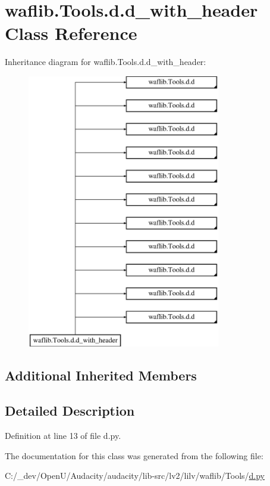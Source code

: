 \hypertarget{classwaflib_1_1_tools_1_1d_1_1d__with__header}{}\section{waflib.\+Tools.\+d.\+d\+\_\+with\+\_\+header Class Reference}
\label{classwaflib_1_1_tools_1_1d_1_1d__with__header}
Inheritance diagram for waflib.\+Tools.\+d.\+d\+\_\+with\+\_\+header\+:\begin{figure}[H]
\begin{center}
\leavevmode
\includegraphics[height=12.000000cm]{classwaflib_1_1_tools_1_1d_1_1d__with__header}
\end{center}
\end{figure}
\subsection*{Additional Inherited Members}


\subsection{Detailed Description}


Definition at line 13 of file d.\+py.



The documentation for this class was generated from the following file\+:\begin{DoxyCompactItemize}
\item 
C\+:/\+\_\+dev/\+Open\+U/\+Audacity/audacity/lib-\/src/lv2/lilv/waflib/\+Tools/\hyperlink{lilv_2waflib_2_tools_2d_8py}{d.\+py}\end{DoxyCompactItemize}
